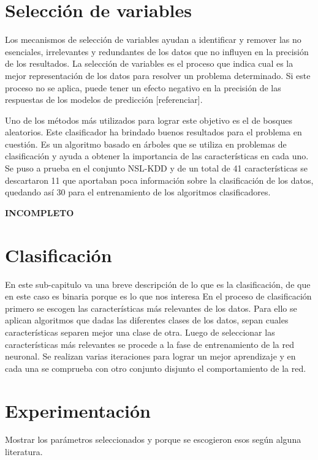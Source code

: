 \section{Selección de variables}
Los mecanismos de selección de variables ayudan a identificar y remover las no esenciales, irrelevantes y redundantes de los datos que no influyen en la precisión de los resultados. La selección de variables es el proceso que indica cual es la mejor representación de los datos para resolver un problema determinado. Si este proceso no se aplica, puede tener un efecto negativo en la precisión de las respuestas de los modelos de predicción [referenciar].

Uno de los métodos más utilizados para lograr este objetivo es el de bosques aleatorios. Este clasificador ha brindado buenos resultados para el problema en cuestión. Es un algoritmo basado en árboles que se utiliza en problemas de clasificación y ayuda a obtener la importancia de las características en cada uno. Se puso a prueba en el conjunto NSL-KDD y de un total de 41 características se descartaron 11 que aportaban poca información sobre la clasificación de los datos, quedando así 30 para el entrenamiento de los algoritmos clasificadores.

\textbf{INCOMPLETO}
\section{Clasificación}
En este sub-capitulo va una breve descripción de lo que es la clasificación, de que en este caso es binaria porque es lo que nos interesa
En el proceso de clasificación primero se escogen las características más relevantes de los datos. Para ello se aplican algoritmos que dadas las diferentes clases de los datos, sepan cuales características separen mejor una clase de otra. Luego de seleccionar las características más relevantes se procede a la fase de entrenamiento de la red neuronal. Se realizan varias iteraciones para lograr un mejor aprendizaje y en cada una se comprueba con otro conjunto disjunto el comportamiento de la red.


\section{Experimentación}
Mostrar los parámetros seleccionados y porque se escogieron esos según alguna literatura.

